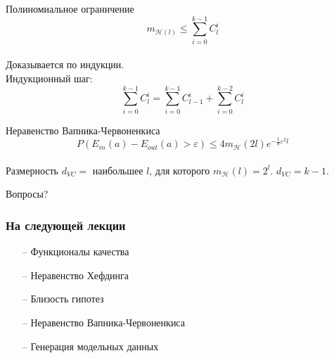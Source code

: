 \documentclass[10pt]{beamer}
\begin{document}
\begin{frame}{Полиномиальное ограничение}  
  $$m_{\mathcal{H}(l)} \leq \sum\limits_{i=0}^{k-1} C_l^i$$\\
  Доказывается по индукции.\\
  Индукционный шаг:
  $$\sum\limits_{i=0}^{k-1} C_l^i = \sum\limits_{i=0}^{k-1} C_{l-1}^i + \sum\limits_{i=0}^{k-2} C_l^i$$
\end{frame}

\begin{frame}{Неравенство Вапника-Червоненкиса}  
  $$P(E_{in}(a) - E_{out}(a) > \varepsilon) \leq 4 m_{\mathcal{H}}(2l) e^{-\frac{1}{8}\varepsilon^2l}$$\\
  \bigbreak
  Размерность $d_{VC} = $ наибольшее $l$, для которого $m_{\mathcal{H}}(l) = 2^l$. $d_{VC} = k-1$.  
\end{frame}

\begin{frame}[standout]
  Вопросы?
\end{frame}

\appendix

\begin{frame}\frametitle{На следующей лекции}
	\begin{itemize}
    	\item[--] Функционалы качества
    	\item[--] Неравенство Хефдинга
    	\item[--] Близость гипотез
    	\item[--] Неравенство Вапника-Червоненкиса
    	\item[--] Генерация модельных данных    	    	
	\end{itemize}
\end{frame}
\end{document}
